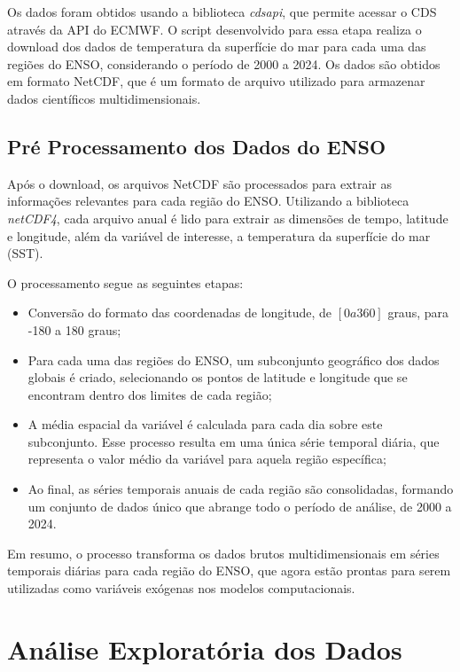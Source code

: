 Os dados foram obtidos usando a biblioteca \textit{cdsapi}, que permite acessar o CDS através da
API do ECMWF. O script desenvolvido para essa etapa realiza o download dos dados de temperatura da superfície do mar
para cada uma das regiões do ENSO, considerando o período de 2000 a 2024. Os dados são obtidos em formato NetCDF, que é 
um formato de arquivo utilizado para armazenar dados científicos multidimensionais.

\subsection{Pré Processamento dos Dados do ENSO} %
Após o download, os arquivos NetCDF são processados para extrair as informações relevantes para cada região do ENSO. 
Utilizando a biblioteca \textit{netCDF4}, cada arquivo anual é lido para extrair as dimensões de tempo, latitude e longitude, 
além da variável de interesse, a temperatura da superfície do mar (SST).

O processamento segue as seguintes etapas:
\begin{itemize}
\item Conversão do formato das coordenadas de longitude, de $ [0 a 360] $ graus, para -180 a 180 graus;
\item Para cada uma das regiões do ENSO, um subconjunto geográfico dos dados globais é criado, selecionando os pontos
de latitude e longitude que se encontram dentro dos limites de cada região;
\item A média espacial da variável é calculada para cada dia sobre este subconjunto. Esse processo resulta em uma única série
temporal diária, que representa o valor médio da variável para aquela região específica;
\item Ao final, as séries temporais anuais de cada região são consolidadas, formando um conjunto de dados único que abrange
todo o período de análise, de 2000 a 2024.
\end{itemize}

Em resumo, o processo transforma os dados brutos multidimensionais em séries temporais diárias para cada região
do ENSO, que agora estão prontas para serem utilizadas como variáveis exógenas nos modelos computacionais.


\section{Análise Exploratória dos Dados} %

